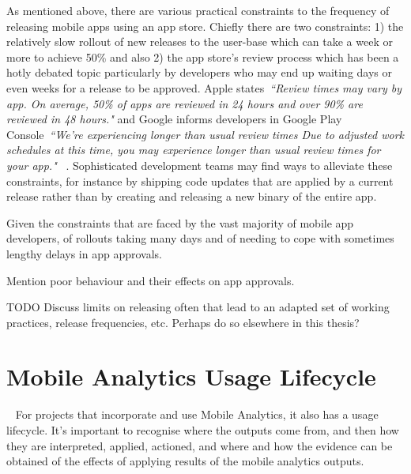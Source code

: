 As mentioned above, there are various practical constraints to the frequency of releasing mobile apps using an app store. Chiefly there are two constraints: 1) the relatively slow rollout of new releases to the user-base which can take a week or more to achieve 50\% and also 2) the app store's review process which has been a hotly debated topic particularly by developers who may end up waiting days or even weeks for a release to be approved. Apple states~\emph{``Review times may vary by app. On average, 50\% of apps are reviewed in 24 hours and over 90\% are reviewed in 48 hours."} and Google informs developers in Google Play Console~\emph{``We're experiencing longer than usual review times
Due to adjusted work schedules at this time, you may experience longer than usual review times for your app."} ~. Sophisticated development teams may find ways to alleviate these constraints, for instance by shipping code updates that are applied by a current release rather than by creating and releasing a new binary of the entire app.

Given the constraints that are faced by the vast majority of mobile app developers, of rollouts taking many days and of needing to cope with sometimes lengthy delays in app approvals. 

Mention poor behaviour and their effects on app approvals.

TODO Discuss limits on releasing often that lead to an adapted set of working practices, release frequencies, etc. Perhaps do so elsewhere in this thesis?

\section{Mobile Analytics Usage Lifecycle}~\label{section-mobile-analytics-usage-lifecycle}
For projects that incorporate and use Mobile Analytics, it also has a usage lifecycle. It's important to recognise where the outputs come from, and then how they are interpreted, applied, actioned, and where and how the evidence can be obtained of the effects of applying results of the mobile analytics outputs.

